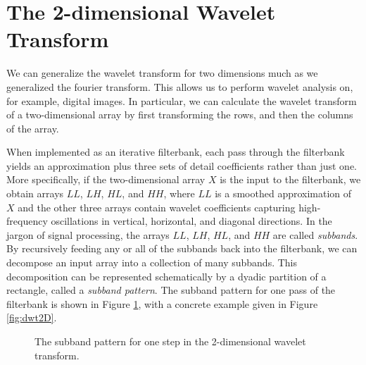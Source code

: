 \section*{The 2-dimensional Wavelet Transform} %

We can generalize the wavelet transform for two dimensions much as we generalized the fourier transform.
This allows us to perform wavelet analysis on, for example, digital images.
In particular, we can calculate the wavelet transform of a two-dimensional
array  by first transforming the rows, and then the columns of the array.

When implemented as an iterative filterbank, each pass through the filterbank yields an approximation plus three sets of detail coefficients
rather than just one.
More specifically, if the two-dimensional array $X$ is the input to the filterbank, we obtain arrays $LL$, $LH$, $HL$, and $HH$,
where $LL$ is a smoothed approximation of $X$ and the other three arrays contain wavelet coefficients capturing high-frequency
oscillations in vertical, horizontal, and diagonal directions.
In the jargon of signal processing, the arrays $LL$, $LH$, $HL$, and $HH$ are called \emph{subbands}.
By recursively feeding any or all of the subbands back into the filterbank, we can decompose an input array into a collection
of many subbands.
This decomposition can be represented schematically by a dyadic partition of a rectangle, called a \emph{subband pattern}.
The subband pattern for one pass of the filterbank is shown in Figure \ref{fig:2dsubbands}, with a concrete example given in Figure \ref{fig:dwt2D}.
\begin{figure}
\caption{The subband pattern for one step in the 2-dimensional wavelet transform.}
\label{fig:2dsubbands}
\end{figure}
